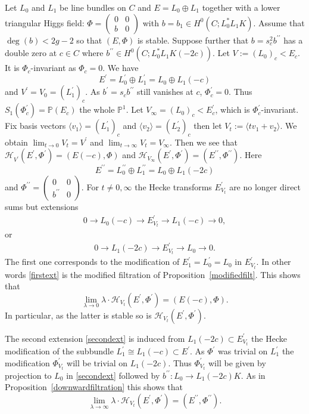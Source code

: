 \documentclass[12pt]{article}
\numberwithin{equation}{section}
\theoremstyle{remark}
\theoremstyle{definition}
\numberwithin{theorem}{section}
\def\beq{\begin{eqnarray}}
\def\eeq{\end{eqnarray}}
\def\calH{\mathcal{H}}
\def\P{\mathbb{P}}
\renewcommand{\1}{\mathbbm{1}}
\begin{document}
Let $L_0$ and $L_1$ be line bundles on $C$ and $E=L_0\oplus L_1$ together with a lower triangular Higgs field: $\Phi=\left(\begin{array}{cc}0&0\\b&0\end{array} \right)$ with $b=b_1\in H^0(C;L_0^*L_1K)$. Assume that $\deg(b)<2g-2$ so that $(E,\Phi)$ is stable. Suppose further that $b=s_c^2 b^{\prime\prime}$ has a double zero at $c\in C$ where $b^{\prime\prime}\in H^0(C;L^*_0L_1K(-2c)).$ Let $V:=(L_0)_c< E_c$. It is $\Phi_c$-invariant as $\Phi_c=0$. We have $$E^\prime=L_0^\prime\oplus L_1^\prime=L_0\oplus L_1(-c)$$ and $V^\prime=V_0= (L_1^\prime)_c$. As $b^\prime=s_c b^{\prime\prime}$ still vanishes at $c$, $\Phi^\prime_c=0$. Thus $S_{1}(\Phi^\prime_c)=\P(E_c)$ the whole $\P^1$. Let $V_\infty=(L_0)_c<E^\prime_c$, which is $\Phi^\prime_c$-invariant. Fix basis vectors $\langle v_1\rangle=(L^\prime_1)_c$ and $\langle v_2 \rangle=(L^\prime_2)_c$ then let $V_t:=\langle tv_1+v_2 \rangle.$ 
We obtain $\lim_{t\to 0} V_t=V^\prime$ and $\lim_{t\to \infty} V_t=V_\infty$. Then we see that $\calH_{V^\prime}(E^\prime,\Phi^\prime)=(E(-c),\Phi)$ and  $\calH_{V_\infty}(E^\prime,\Phi^\prime)=(E^{\prime\prime},\Phi^{\prime\prime})$. Here $$E^{\prime\prime}=L_0^{\prime\prime}\oplus L_1^{\prime\prime}=L_0\oplus L_1(-2c)$$ and $\Phi^{\prime\prime}=\left(\begin{array}{cc}0&0\\b^{\prime\prime}&0\end{array}\right).$ For $t\neq 0,\infty$ the Hecke transforms $E^\prime_{V_t}$ are no longer direct sums but extensions \beq \label{firstext}0\to L_0(-c)\to E^\prime_{V_t}\to L_1(-c)\to 0,\eeq or \beq \label{secondext}0\to L_1(-2c) \to E^\prime_{V_t}\to L_0\to 0.\eeq The first one corresponds to  the modification of $E^\prime_1=L_0^\prime=L_0$ in $E^\prime_{V_t}$. In other words \eqref{firstext} is the modified filtration of Proposition~\ref{modifiedfilt}. This shows that $$\lim_{\lambda\to 0}\lambda\cdot \calH_{V_t}(E^\prime,\Phi^\prime) = (E(-c),\Phi).$$ In particular, as the latter is stable so is $\calH_{V_t}(E^\prime,\Phi^\prime)$.  

The second extension \eqref{secondext} is induced from $L_1(-2c)\subset E^\prime_{V_t}$ the Hecke modification of the subbundle $L_1^\prime\cong L_1(-c)\subset E^\prime$. As $\Phi^\prime$ was trivial on $L_1^\prime$ the modification $\Phi^\prime_{V_t}$ will be trivial on $L_1(-2c)$. Thus $\Phi^\prime_{V_t}$ will be given by projection to $L_0$ in \eqref{secondext} followed by $b^{\prime\prime}:L_0\to L_1(-2c)K$. As in Proposition~\ref{downwardfiltration} this shows that $$\lim_{\lambda\to \infty} \lambda\cdot \calH_{V_t}(E^\prime,\Phi^\prime) =(E^{\prime\prime},\Phi^{\prime\prime}). $$
\end{document}
